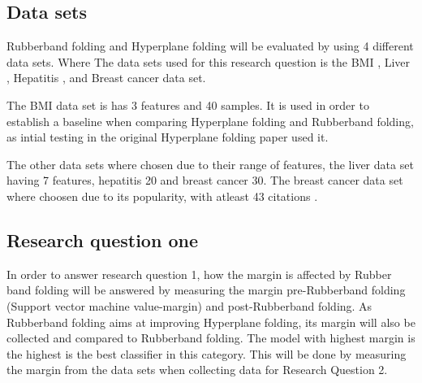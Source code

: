 \documentclass[a4paper,twoside]{bth}
\begin{document}
\subsection{Data sets}
Rubberband folding and Hyperplane folding will be evaluated by using 4 different data sets. Where 
The data sets used for this research question is the BMI \cite{unpublished}, Liver \cite{Dua:2019}, Hepatitis \cite{Dua:2019}, and Breast cancer \cite{breastcancer} data set. \par
The BMI data set is has 3 features and 40 samples. It is used in order to establish a baseline when comparing Hyperplane folding and Rubberband folding, as intial testing in the original Hyperplane folding
paper \cite{unpublished} used it. \par
The other data sets where chosen due to their range of features, the liver data set having 7 features, hepatitis 20 and breast cancer 30. The breast cancer data set where choosen due to its popularity, with atleast 43 citations \cite{Dua:2019}. \par

\subsection{Research question  one}
In order to answer research question 1, how the margin is affected by Rubber band folding will be answered by measuring the margin pre-Rubberband folding (Support vector machine value-margin) and post-Rubberband folding. As Rubberband folding aims at improving Hyperplane folding, its margin will also be collected and compared to Rubberband folding. The model with highest margin is the highest is the best classifier in this category. This will be done by measuring the margin from the data sets when collecting data for Research Question 2.
\end{document}
